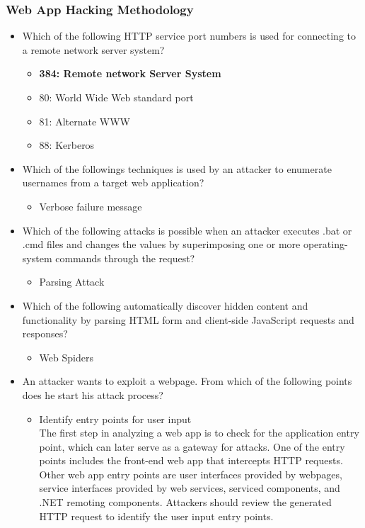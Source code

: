 \subsubsection{Web App Hacking Methodology}
\begin{itemize}
    \item Which of the following HTTP service port numbers is used for connecting to a remote network server system?
    \begin{itemize}
        \item \textbf{384: Remote network Server System}
        \item 80: World Wide Web standard port
        \item 81: Alternate WWW
        \item 88: Kerberos
    \end{itemize}
    \item Which of the followings techniques is used by an attacker to enumerate usernames from a target web application?
    \begin{itemize}
        \item Verbose failure message
    \end{itemize}
    \item Which of the following attacks is possible when an attacker executes .bat or .cmd files and changes the values by superimposing one or more operating-system commands through the request?
    \begin{itemize}
        \item Parsing Attack
    \end{itemize}
    \item Which of the following automatically discover hidden content and functionality by parsing HTML form and client-side JavaScript requests and responses?
    \begin{itemize}
        \item Web Spiders
    \end{itemize}
    \item An attacker wants to exploit a webpage. From which of the following points does he start his attack process?
    \begin{itemize}
        \item Identify entry points for user input\\
        The first step in analyzing a web app is to check for the application entry point, which can later serve as a gateway for attacks. One of the entry points includes the front-end web app that intercepts HTTP requests. Other web app entry points are user interfaces provided by webpages, service interfaces provided by web services, serviced components, and .NET remoting components. Attackers should review the generated HTTP request to identify the user input entry points.
    \end{itemize}
\end{itemize}
